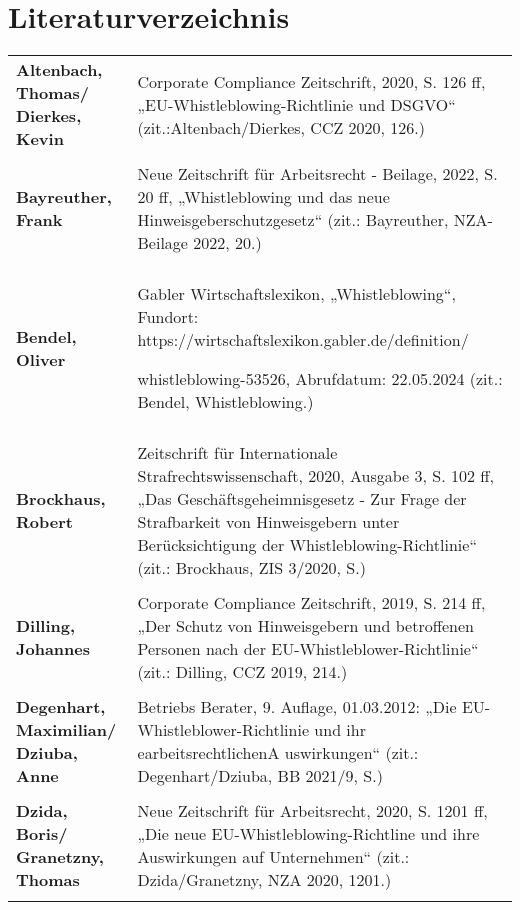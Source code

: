 \section{Literaturverzeichnis}

\begin{longtable}{R{5 cm}R{8,5 cm}}

    \textbf{Altenbach, Thomas/ Dierkes, Kevin} & Corporate Compliance Zeitschrift, 2020, S. 126 ff, „EU-Whistleblowing-Richtlinie und DSGVO“ (zit.:Altenbach/Dierkes, CCZ 2020, 126.) \\
    \\

    \textbf{Bayreuther, Frank} & Neue Zeitschrift für Arbeitsrecht - Beilage, 2022, S. 20 ff,  „Whistleblowing und das neue Hinweisgeberschutzgesetz“ (zit.: Bayreuther, NZA-Beilage 2022, 20.) \\
    \\

    \textbf{Bendel, Oliver} & Gabler Wirtschaftslexikon, „Whistleblowing“, Fundort: https://wirtschaftslexikon.gabler.de/definition/
    
    whistleblowing-53526, Abrufdatum: 22.05.2024  (zit.: Bendel, Whistleblowing.) \\
    \\

    \textbf{Brockhaus, Robert} & Zeitschrift für Internationale Strafrechtswissenschaft, 2020, Ausgabe 3, S. 102 ff, „Das Geschäftsgeheimnisgesetz - Zur Frage der Strafbarkeit von Hinweisgebern unter Berücksichtigung der Whistleblowing-Richtlinie“ (zit.: Brockhaus, ZIS 3/2020, S.) \\
    \\

    \textbf{Dilling, Johannes} &  Corporate Compliance Zeitschrift, 2019, S. 214 ff, „Der Schutz von Hinweisgebern und betroffenen Personen nach der EU-Whistleblower-Richtlinie“ (zit.: Dilling, CCZ 2019, 214.) \\
    \\

    \textbf{Degenhart, Maximilian/ Dziuba, Anne} & Betriebs Berater, 9. Auflage, 01.03.2012: „Die EU-Whistleblower-Richtlinie und ihr earbeitsrechtlichenA uswirkungen“ (zit.: Degenhart/Dziuba, BB 2021/9, S.) \\
    \\

    \textbf{Dzida, Boris/ Granetzny, Thomas} & Neue Zeitschrift für Arbeitsrecht, 2020, S. 1201 ff, „Die neue EU-Whistleblowing-Richtline und ihre Auswirkungen auf Unternehmen“ (zit.: Dzida/Granetzny, NZA 2020, 1201.) \\
    \\ 


\end{longtable}
